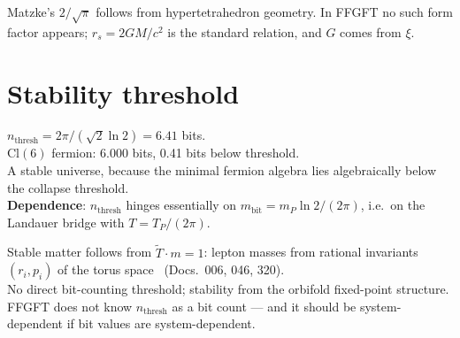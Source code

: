 \begin{tcolorbox}[divbox, title={Divergence}]
  Matzke's $2/\sqrt{\pi}$ follows from hypertetrahedron geometry.
  In FFGFT no such form factor appears; $r_s = 2GM/c^2$ is the standard
  relation, and $G$ comes from $\xi$.
\end{tcolorbox}

\section{Stability threshold}

\begin{tcolorbox}[matzbox, title={Matzke}]
  $n_{\mathrm{thresh}} = 2\pi/(\sqrt{2}\ln 2) = 6.41$ bits. \B\\
  $\mathrm{Cl}(6)$ fermion: 6.000 bits, 0.41 bits below threshold.\\
  A stable universe, because the minimal fermion algebra lies
  algebraically below the collapse threshold.\\[2pt]
  \textbf{Dependence}: $n_{\mathrm{thresh}}$ hinges essentially on
  $m_{\mathrm{bit}} = m_P\ln 2/(2\pi)$, i.e.\ on the Landauer bridge
  with $T = T_P/(2\pi)$.
\end{tcolorbox}

\begin{tcolorbox}[ffgftbox, title={FFGFT}]
  Stable matter follows from $\tilde{T}\cdot m = 1$:
  lepton masses from rational invariants $(r_i, p_i)$ of the torus
  space \K\ (Docs.\ 006, 046, 320).\\
  No direct bit-counting threshold; stability from the orbifold
  fixed-point structure.\\
  FFGFT does not know $n_{\mathrm{thresh}}$ as a bit count — and it
  should be system-dependent if bit values are system-dependent.
\end{tcolorbox}

